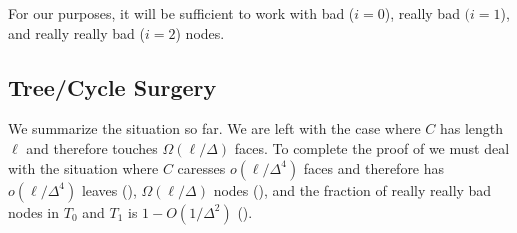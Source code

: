 \documentclass[a4paper,UKenglish]{socg-lipics-v2019}
\newcommand{\dual}[1]{{#1}^\star}
\begin{document}
For our purposes, it will be sufficient to work with bad ($i=0$), really
bad $(i=1$), and really really bad ($i=2$) nodes.

\subsection{Tree/Cycle Surgery}

We summarize the situation so far.  We are left with the case where
$C$ has length $\ell$ and therefore touches $\Omega(\ell/\Delta)$
faces.  To complete the proof of  we must deal with
the situation where $C$ caresses $o(\ell/\Delta^4)$ faces and
therefore has $o(\ell/\Delta^4)$ leaves (),
$\Omega(\ell/\Delta)$ nodes (),
and the fraction of really really bad nodes in $T_0$ and $T_1$ is
$1-O(1/\Delta^2)$ (). 


\end{document}
